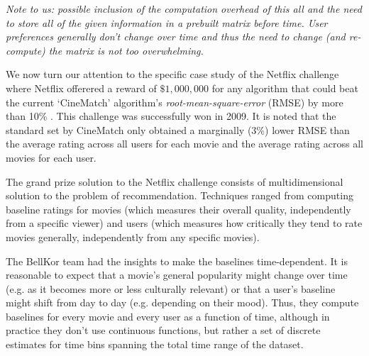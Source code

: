 \documentclass[11pt]{article}
\begin{document}
\par \textit{Note to us: possible inclusion of the computation overhead of this all and the need to store all of the given information in a prebuilt matrix before time. User preferences generally don't change over time and thus the need to change (and re-compute) the matrix is not too overwhelming.}\\
\par We now turn our attention to the specific case study of the Netflix challenge where Netflix offerered a reward of $\$1,000,000$ for any algorithm that could beat the current `CineMatch' algorithm's \textit{root-mean-square-error} (RMSE) by more than 10\% \cite{chapter9}. This challenge was successfully won in 2009. It is noted that the standard set by CineMatch only obtained a marginally (3\%) lower RMSE than the average rating across all users for each movie and the average rating across all movies for each user.\\
\par The grand prize solution to the Netflix challenge \cite{netflix} consists of multidimensional solution to the problem of recommendation. Techniques ranged from computing baseline ratings for movies (which measures their overall quality, independently from a specific viewer) and users (which measures how critically they tend to rate movies generally, independently from any specific movies).
\par
The BellKor team had the insights to make the baselines time-dependent. It is reasonable to expect that a movie's general popularity might change over time (e.g. as it becomes more or less culturally relevant) or that a user's baseline might shift from day to day (e.g. depending on their mood). Thus, they compute baselines for every movie and every user as a function of time, although in practice they don't use continuous functions, but rather a set of discrete estimates for time bins spanning the total time range of the dataset.



\end{document}
